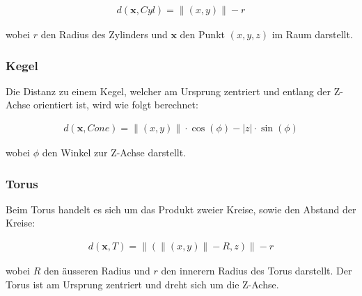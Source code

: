 \begin{gather}
    d(\bm{x}, Cyl) = \|(x, y)\| - r
\end{gather}

wobei $r$ den Radius des Zylinders und $\bm{x}$ den Punkt $(x,y,z)$ im
Raum darstellt.

\subsubsection{Kegel}
\label{ssubsec:implicit_surfaces_primitives_cone}

Die Distanz zu einem Kegel, welcher am Ursprung zentriert und entlang
der Z-Achse orientiert ist, wird wie folgt berechnet:

\begin{gather}
    d(\bm{x}, Cone) = \|(x, y)\| \cdot \cos(\phi) - |z| \cdot \sin(\phi)
\end{gather}

wobei $\phi$ den Winkel zur Z-Achse darstellt.

\subsubsection{Torus}
\label{ssubsec:implicit_surfaces_primitives_torus}

Beim Torus handelt es sich um das Produkt zweier Kreise, sowie den Abstand der Kreise:

\begin{gather}
    d(\bm{x}, T) = \|(\|(x, y)\| - R, z)\| - r
\end{gather}

wobei $R$ den äusseren Radius und $r$ den innerern Radius des Torus darstellt.
Der Torus ist am Ursprung zentriert und dreht sich um die Z-Achse.

